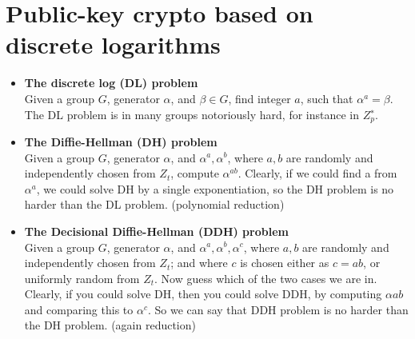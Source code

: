 \documentclass[a4paper,10pt]{article}
\begin{document}
\section*{Public-key crypto based on discrete logarithms}
\begin{itemize}
\item[] \textbf{The discrete log (DL) problem}\\
Given a group $G$, generator $\alpha$, and $\beta \in G$, find integer $a$, such that $\alpha^a = \beta$. The DL problem is in many groups notoriously hard, for instance in $Z^{∗}_p$.
\item[]\textbf{The Diffie-Hellman (DH) problem}\\
Given a group $G$, generator $\alpha$, and $\alpha^a,\alpha^b$, where $a,b$ are randomly and independently chosen from $Z_t$, compute $\alpha^{ab}$.
Clearly, if we could find a from $\alpha^a$, we could solve DH by a single exponentiation, so the DH problem is no harder than the DL problem. (polynomial reduction)
\item[] \textbf{The Decisional Diffie-Hellman (DDH) problem}\\
Given a group $G$, generator $\alpha$, and $\alpha^a,\alpha^b,\alpha^c$, where $a,b$ are randomly and independently chosen from $Z_t$; and where $c$ is chosen either as $c = ab$, or uniformly random from $Z_t$. Now guess which of the two cases we are in. Clearly, if you could solve DH, then you could solve DDH, by computing $\alpha{ab}$ and comparing this to $\alpha^c$. So we can say that DDH problem is no harder than the DH problem. (again reduction)
\end{itemize}
\end{document}
